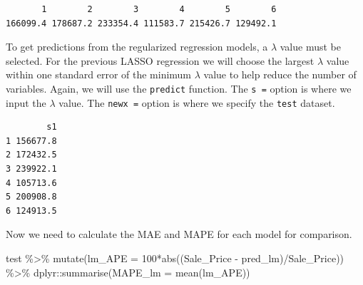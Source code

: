 \documentclass[
  letterpaper,
  DIV=11,
  numbers=noendperiod]{scrreprt}
\newenvironment{Shaded}{\begin{snugshade}}{\end{snugshade}}
\newcommand{\AttributeTok}[1]{\textcolor[rgb]{0.40,0.45,0.13}{#1}}
\newcommand{\DecValTok}[1]{\textcolor[rgb]{0.68,0.00,0.00}{#1}}
\newcommand{\FloatTok}[1]{\textcolor[rgb]{0.68,0.00,0.00}{#1}}
\newcommand{\FunctionTok}[1]{\textcolor[rgb]{0.28,0.35,0.67}{#1}}
\newcommand{\NormalTok}[1]{\textcolor[rgb]{0.00,0.23,0.31}{#1}}
\newcommand{\OtherTok}[1]{\textcolor[rgb]{0.00,0.23,0.31}{#1}}
\newcommand{\SpecialCharTok}[1]{\textcolor[rgb]{0.37,0.37,0.37}{#1}}
\begin{document}
\begin{Shaded}
\end{Shaded}

\begin{verbatim}
       1        2        3        4        5        6 
166099.4 178687.2 233354.4 111583.7 215426.7 129492.1 
\end{verbatim}

To get predictions from the regularized regression models, a \(\lambda\)
value must be selected. For the previous LASSO regression we will choose
the largest \(\lambda\) value within one standard error of the minimum
\(\lambda\) value to help reduce the number of variables. Again, we will
use the \texttt{predict} function. The \texttt{s\ =} option is where we
input the \(\lambda\) value. The \texttt{newx\ =} option is where we
specify the \texttt{test} dataset.

\begin{Shaded}
\end{Shaded}

\begin{verbatim}
        s1
1 156677.8
2 172432.5
3 239922.1
4 105713.6
5 200908.8
6 124913.5
\end{verbatim}

Now we need to calculate the MAE and MAPE for each model for comparison.

\begin{Shaded}
\begin{Highlighting}[]
\NormalTok{test }\SpecialCharTok{\%\textgreater{}\%}
  \FunctionTok{mutate}\NormalTok{(}\AttributeTok{lm\_APE =} \DecValTok{100}\SpecialCharTok{*}\FunctionTok{abs}\NormalTok{((Sale\_Price }\SpecialCharTok{{-}}\NormalTok{ pred\_lm)}\SpecialCharTok{/}\NormalTok{Sale\_Price)) }\SpecialCharTok{\%\textgreater{}\%}
\NormalTok{  dplyr}\SpecialCharTok{::}\FunctionTok{summarise}\NormalTok{(}\AttributeTok{MAPE\_lm =} \FunctionTok{mean}\NormalTok{(lm\_APE))}
\end{Highlighting}
\end{Shaded}
\end{document}
